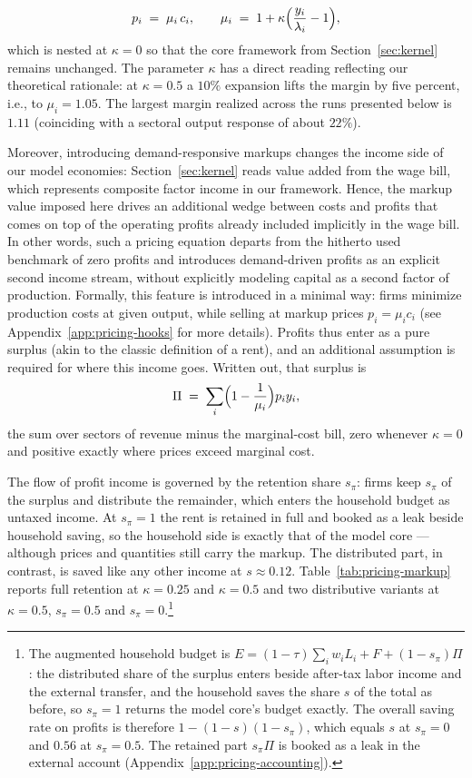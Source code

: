 \begin{equation}\label{eq:markup-extension}
  p_i \;=\; \mu_i\,c_i, \qquad \mu_i \;=\; 1 + \kappa\Bigl(\frac{y_i}{\lambda_i} - 1\Bigr),
\end{equation}
which is nested at $\kappa = 0$ so that the core framework from Section~\ref{sec:kernel} remains unchanged. The parameter $\kappa$ has a direct reading reflecting our theoretical rationale: at $\kappa = 0.5$ a $10\%$ expansion lifts the margin by five percent, i.e., to $\mu_i = 1.05$. The largest margin realized across the runs presented below is $1.11$ (coinciding with a sectoral output response of about $22\%$). 

Moreover, introducing demand-responsive markups changes the income side of our model economies: Section~\ref{sec:kernel} reads value added from the wage bill, which represents composite factor income in our framework. Hence, the markup value imposed here drives an additional wedge between costs and profits that comes on top of the operating profits already included implicitly in the wage bill. In other words, such a pricing equation departs from the hitherto used benchmark of zero profits and introduces demand-driven profits as an explicit second income stream, without explicitly modeling capital as a second factor of production. Formally, this feature is introduced in a minimal way: firms minimize production costs at given output, while selling at markup prices $p_i=\mu_i c_i$ (see Appendix~\ref{app:pricing-hooks} for more details). Profits thus enter as a pure surplus (akin to the classic definition of a rent), and an additional assumption is required for where this income goes.
Written out, that surplus is
\begin{equation}\label{eq:profit-bill}
  \Pi \;=\; \sum_i \Bigl(1 - \frac{1}{\mu_i}\Bigr) p_i y_i ,
\end{equation}
the sum over sectors of revenue minus the marginal-cost bill, zero whenever
$\kappa = 0$ and positive exactly where prices exceed marginal cost.

The flow of profit income is governed by the retention share $s_\pi$: firms keep $s_\pi$ of the surplus and distribute the remainder, which enters the household budget as untaxed income. At $s_\pi = 1$ the rent is retained in full and booked as a leak beside household saving, so the household side is exactly that of the model core --- although prices and quantities still carry the markup. The distributed part, in contrast, is saved like any other income at $s \approx 0.12$. Table~\ref{tab:pricing-markup} reports full retention at $\kappa = 0.25$ and $\kappa = 0.5$ and two distributive variants at $\kappa = 0.5$, $s_\pi = 0.5$ and $s_\pi = 0$.\footnote{The augmented household budget is $E = (1-\tau)\sum_i w_i L_i + F + (1-s_\pi)\Pi$: the distributed share of the surplus enters beside after-tax labor income and the external transfer, and the household saves the share $s$ of the total as before, so $s_\pi = 1$ returns the model core's budget exactly. The overall saving rate on profits is therefore $1-(1-s)(1-s_\pi)$, which equals $s$ at $s_\pi = 0$ and $0.56$ at $s_\pi = 0.5$. The retained part $s_\pi\Pi$ is booked as a leak in the external account (Appendix~\ref{app:pricing-accounting}).}

